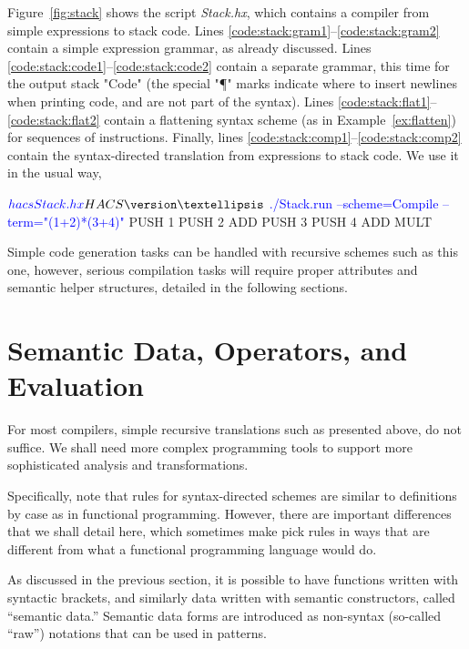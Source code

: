 \documentclass[11pt]{article} %
\begin{document}
\begin{example}\label{ex:stack}
  Figure~\ref{fig:stack} shows the \HAX script \emph{Stack.hx}, which contains a compiler from
  simple expressions to stack code. Lines \ref{code:stack:gram1}--\ref{code:stack:gram2} contain a
  simple expression grammar, as already discussed. Lines
  \ref{code:stack:code1}--\ref{code:stack:code2} contain a separate grammar, this time for the
  output stack "Code" (the special "¶" marks indicate where to insert newlines when printing code,
  and are not part of the syntax). Lines \ref{code:stack:flat1}--\ref{code:stack:flat2} contain a
  flattening syntax scheme (as in Example~\ref{ex:flatten}) for sequences of instructions.  Finally,
  lines \ref{code:stack:comp1}--\ref{code:stack:comp2} contain the syntax-directed translation from
  expressions to stack code. We use it in the usual way,
  \begin{code}[commandchars=\\\{\}]
$ \textcolor{blue}{hacs Stack.hx}
HACS \version
…
$ \textcolor{blue}{./Stack.run --scheme=Compile --term="(1+2)*(3+4)"}
  PUSH 1 
  PUSH 2 
  ADD 
  PUSH 3 
  PUSH 4 
  ADD 
  MULT 
  \end{code}
  Simple code generation tasks can be handled with recursive schemes such as this one, however,
  serious compilation tasks will require proper attributes and semantic helper structures, detailed
  in the following sections.
\end{example}


\section{Semantic Data, Operators, and Evaluation}
\label{sec:eval}

For most compilers, simple recursive translations such as presented above, do not suffice. We shall
need more complex programming tools to support more sophisticated analysis and transformations.

Specifically, note that rules for syntax-directed schemes are similar to definitions by case as in
functional programming. However, there are important differences that we shall detail here, which
sometimes make \HAX pick rules in ways that are different from what a functional programming
language would do.

As discussed in the previous section, it is possible to have functions written with syntactic
brackets, and similarly data written with semantic constructors, called ``semantic data.''  Semantic
data forms are introduced as non-syntax (so-called ``raw'') notations that can be used in patterns.
\end{document}

